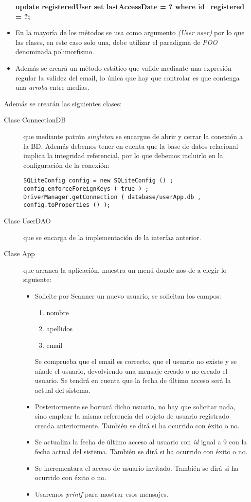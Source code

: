 \documentclass[addpoints,12pt]{exam}
\begin{document}
\begin{questions}
\begin{itemize}
\textbf{update registeredUser set lastAccessDate = ? where id\_registered = ?;}
\item En la mayoría de los métodos se usa como argumento \emph{(User user)} por lo que las clases, en este caso solo una, debe utilizar el paradigma de \emph{POO} denominada polimorfismo.
\item Además se creará un método estático que valide mediante una expresión regular la validez del email, lo única que hay que controlar es que contenga una \emph{arroba} entre medias. 
\end{itemize}
\newpage
Además se crearán las siguientes clases:
\begin{description}
\item[Clase ConnectionDB] que mediante patrón \emph{singleton} se encargue de abrir y cerrar la conexión a la BD. Además debemos tener en cuenta que la base de datos relacional implica la integridad referencial, por lo que debemos incluirlo en la configuración de la conexión:
\begin{verbatim}
SQLiteConfig config = new SQLiteConfig () ;
config.enforceForeignKeys ( true ) ;
DriverManager.getConnection ( database/userApp.db , config.toProperties () );
\end{verbatim}
\item[Clase UserDAO] que se encarga de la implementación de la interfaz anterior.

\item[Clase App] que arranca la aplicación, muestra un menú donde nos de a elegir  lo siguiente:
\begin{itemize}
\item Solicite por Scanner un nuevo usuario, se solicitan los campos:
\begin{enumerate}
\item nombre
\item apellidos
\item email
\end{enumerate}
Se comprueba que el email es correcto, que el usuario no existe y se añade el usuario, devolviendo una mensaje creado o no creado el usuario. Se tendrá en cuenta que la fecha de último acceso será la actual del sistema.
\item Posteriormente se borrará dicho usuario, no hay que solicitar nada, sino emplear la misma referencia del objeto de usuario registrado creada anteriormente. También se dirá si ha ocurrido con éxito o no.
\item Se actualiza la fecha de último acceso al usuario con \emph{id} igual a 9 con la fecha actual del sistema. También se dirá si ha ocurrido con éxito o no.
\item Se incrementara el acceso de usuario invitado. También se dirá si ha ocurrido con éxito o no.
\item Usaremos \emph{printf} para mostrar esos mensajes.
\end{itemize} 
\end{description}


\end{questions}
\end{document}
